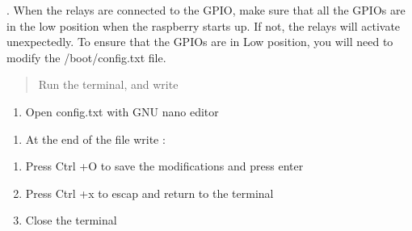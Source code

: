 \documentclass[letterpaper,10pt,english]{sphinxmanual}
\begin{document}
. When the relays are connected to the GPIO, make sure that all the GPIOs are in the low position when the raspberry starts up. If not, the relays will activate unexpectedly.
To ensure that the GPIOs are in Low position, you will need to modify the /boot/config.txt file.
\begin{quote}

\sphinxAtStartPar
Run the terminal, and write

\begin{sphinxVerbatim}[commandchars=\\\{\}]
 
\end{sphinxVerbatim}
\end{quote}
\begin{enumerate}
%
\setcounter{enumi}{3}
\item {} 
\sphinxAtStartPar
Open config.txt with GNU nano editor

\end{enumerate}
\begin{quote}

\begin{sphinxVerbatim}[commandchars=\\\{\}]
  
\end{sphinxVerbatim}
\end{quote}
\begin{enumerate}
%
\setcounter{enumi}{4}
\item {} 
\sphinxAtStartPar
At the end of the file write :

\end{enumerate}
\begin{quote}

\begin{sphinxVerbatim}[commandchars=\\\{\}]
\end{sphinxVerbatim}
\end{quote}
\begin{enumerate}
%
\setcounter{enumi}{5}
\item {} 
\sphinxAtStartPar
Press Ctrl +O to save the modifications and press enter

\item {} 
\sphinxAtStartPar
Press Ctrl +x to escap and return to the terminal

\item {} 
\sphinxAtStartPar
Close the terminal

\end{enumerate}
\end{document}

